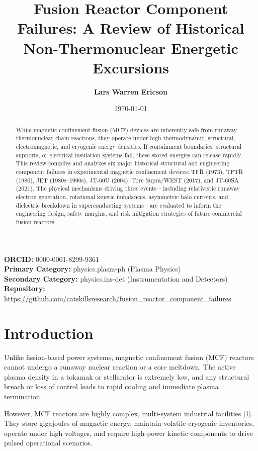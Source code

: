 \documentclass[11pt,a4paper]{article}
\title{\textbf{Fusion Reactor Component Failures: A Review of Historical Non-Thermonuclear Energetic Excursions}}
\author[1]{\textbf{Lars Warren Ericson}}
\affil[1]{Catskills Research Company}
\affil[1]{\texttt{lars.ericson@catskillsresearch.com}}
\date{\today}
\begin{document}
\maketitle

\begin{center}
  \small
  \textbf{ORCID:} 0000-0001-8299-9361 \\
  \textbf{Primary Category:} physics.plasm-ph (Plasma Physics) \\
  \textbf{Secondary Category:} physics.ins-det (Instrumentation and Detectors) \\[0.5em]
  \textbf{Repository:} \url{https://github.com/catskillsresearch/fusion_reactor_component_failures}
\end{center}

\begin{abstract}
While magnetic confinement fusion (MCF) devices are inherently safe from runaway thermonuclear chain reactions, they operate under high thermodynamic, structural, electromagnetic, and cryogenic energy densities. If containment boundaries, structural supports, or electrical insulation systems fail, these stored energies can release rapidly. This review compiles and analyzes six major historical structural and engineering component failures in experimental magnetic confinement devices: TFR (1973), TFTR (1980), JET (1980s–1990s), JT-60U (2004), Tore Supra/WEST (2017), and JT-60SA (2021). The physical mechanisms driving these events—including relativistic runaway electron generation, rotational kinetic imbalances, asymmetric halo currents, and dielectric breakdown in superconducting systems—are evaluated to inform the engineering design, safety margins, and risk mitigation strategies of future commercial fusion reactors.
\end{abstract}

\hypertarget{introduction}{%
\section{Introduction}\label{introduction}}

Unlike fission-based power systems, magnetic confinement fusion (MCF) reactors cannot undergo a runaway nuclear reaction or a core meltdown. The active plasma density in a tokamak or stellarator is extremely low, and any structural breach or loss of control leads to rapid cooling and immediate plasma termination.

However, MCF reactors are highly complex, multi-system industrial facilities {[}1{]}. They store gigajoules of magnetic energy, maintain volatile cryogenic inventories, operate under high voltages, and require high-power kinetic components to drive pulsed operational scenarios.
\end{document}
